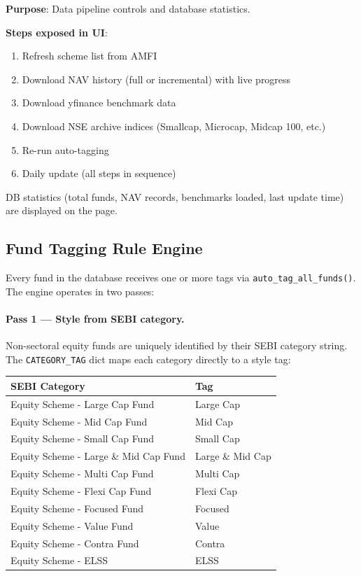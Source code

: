 \documentclass[12pt, a4paper]{article}
\begin{document}
\textbf{Purpose}: Data pipeline controls and database statistics.

\noindent\textbf{Steps exposed in UI}:
\begin{enumerate}[noitemsep]
  \item Refresh scheme list from AMFI
  \item Download NAV history (full or incremental) with live progress
  \item Download yfinance benchmark data
  \item Download NSE archive indices (Smallcap, Microcap, Midcap 100, etc.)
  \item Re-run auto-tagging
  \item Daily update (all steps in sequence)
\end{enumerate}

DB statistics (total funds, NAV records, benchmarks loaded, last update
time) are displayed on the page.

\subsection{Fund Tagging Rule Engine}
\label{sec:tagger}

Every fund in the database receives one or more tags via \texttt{auto\_tag\_all\_funds()}.
The engine operates in two passes:

\paragraph{Pass 1 — Style from SEBI category.}
Non-sectoral equity funds are uniquely identified by their SEBI category string.
The \texttt{CATEGORY\_TAG} dict maps each category directly to a style tag:

\begin{center}
\begin{tabular}{@{}ll@{}}
\toprule
\textbf{SEBI Category} & \textbf{Tag} \\
\midrule
Equity Scheme - Large Cap Fund & Large Cap \\
Equity Scheme - Mid Cap Fund & Mid Cap \\
Equity Scheme - Small Cap Fund & Small Cap \\
Equity Scheme - Large \& Mid Cap Fund & Large \& Mid Cap \\
Equity Scheme - Multi Cap Fund & Multi Cap \\
Equity Scheme - Flexi Cap Fund & Flexi Cap \\
Equity Scheme - Focused Fund & Focused \\
Equity Scheme - Value Fund & Value \\
Equity Scheme - Contra Fund & Contra \\
Equity Scheme - ELSS & ELSS \\
\bottomrule
\end{tabular}
\end{center}
\end{document}
